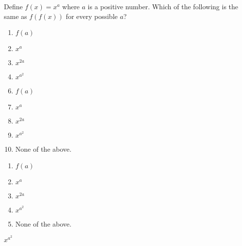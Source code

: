

 Define $f(x)=x^a$ where $a$ is a positive number.  Which of the following is the same as $f(f(x))$ for every possible $a$?


\ifsat
	\begin{enumerate}[label=\Alph*)]
		\item   $f(a)$
		\item  $x^{a}$
		\item  $x^{2a}$
		\item  $x^{a^2}$%
	\end{enumerate}
\else
\fi

\ifacteven
	\begin{enumerate}[label=\textbf{\Alph*.},itemsep=\fill,align=left]
		\setcounter{enumii}{5}
		\item   $f(a)$
		\item  $x^{a}$
		\item  $x^{2a}$
		\addtocounter{enumii}{1}
		\item  $x^{a^2}$%
		\item  None of the above.
	\end{enumerate}
\else
\fi

\ifactodd
	\begin{enumerate}[label=\textbf{\Alph*.},itemsep=\fill,align=left]
		\item   $f(a)$
		\item  $x^{a}$
		\item  $x^{2a}$
		\item  $x^{a^2}$%
		\item  None of the above.
	\end{enumerate}
\else
\fi

\ifgridin
  $x^{a^2}$%

\else
\fi

